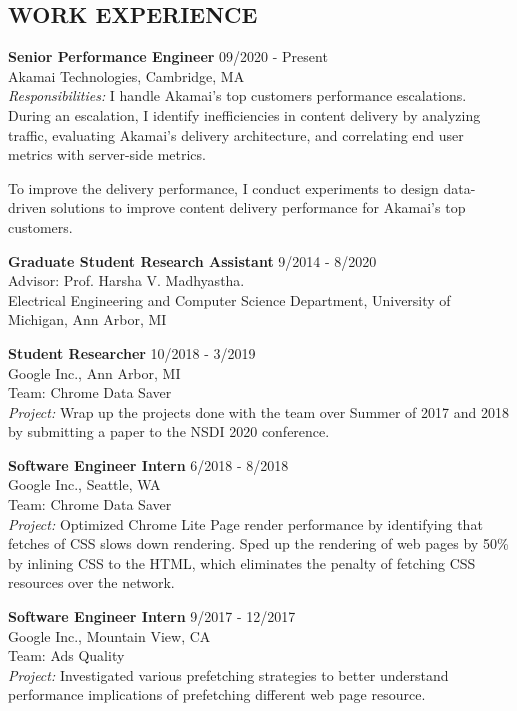 \documentclass[zhemargin]{res}
\begin{document}
\begin{resume}
\section{\small WORK EXPERIENCE}
    \textbf{Senior Performance Engineer} \hfill 09/2020 - Present \\
    Akamai Technologies, Cambridge, MA\\
    \emph{Responsibilities:} I handle Akamai's top customers performance
    escalations. During an escalation, I identify inefficiencies in content
    delivery by analyzing traffic, evaluating Akamai's delivery architecture,
    and correlating end user metrics with server-side metrics.

    To improve the delivery performance, I conduct experiments to design
    data-driven solutions to improve content delivery performance for Akamai's
    top customers.

    \textbf{Graduate Student Research Assistant} \hfill 9/2014 - 8/2020 \\
    Advisor: Prof. Harsha V. Madhyastha.\\
    Electrical Engineering and Computer Science Department, University of Michigan, Ann Arbor, MI

    \textbf{Student Researcher} \hfill 10/2018 - 3/2019 \\
    Google Inc., Ann Arbor, MI\\
    Team: Chrome Data Saver \\
    \emph{Project:} Wrap up the projects done with the team over Summer of 2017
    and 2018 by submitting a paper to the NSDI 2020 conference.

    \textbf{Software Engineer Intern} \hfill 6/2018 - 8/2018 \\
    Google Inc., Seattle, WA\\
    Team: Chrome Data Saver \\
    \emph{Project:} Optimized Chrome Lite Page render performance by
    identifying that fetches of CSS slows down rendering.
    Sped up the rendering of web pages by 50\% by inlining CSS to the HTML,
    which eliminates the penalty of fetching CSS resources over the network.

    \textbf{Software Engineer Intern} \hfill 9/2017 - 12/2017 \\
    Google Inc., Mountain View, CA\\
    Team: Ads Quality \\
    \emph{Project:} Investigated various prefetching strategies to better
    understand performance implications of prefetching different web page resource.


\end{resume}
\end{document}
